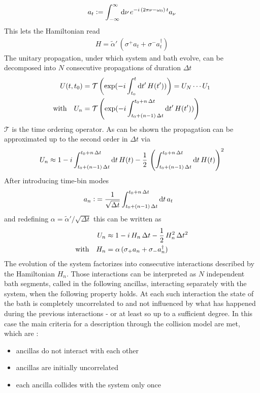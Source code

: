 \begin{align*}
    a_t\vcentcolon=\int_{-\infty}^{\infty}\text{d}\nu\,e^{-i\,(2\pi\nu-\omega_0)\, t}a_\nu
\end{align*}
This lets the Hamiltonian read
\begin{align*}
    H= \tilde{\alpha}'\,(\sigma^+a_t+\sigma^-a^\dagger_t)
\end{align*}
The unitary propagation, under which system and bath evolve, can be decomposed into $N$ consecutive propagations of duration $\Delta t$
\begin{align*}
    U(t,t_0)&=\mathcal{T}\left(  \exp(-i\int_{t_0}^t\text{d} t'\,H(t'))  \right)=U_{N}\cdots U_1\\
    \text{with}\quad U_n&=\mathcal{T}\left( \exp(-i\int_{t_0+(n-1)\,\Delta t}^{t_0+n\,\Delta t}\text{d} t'\,H(t'))  \right)
\end{align*}
$\mathcal{T}$ is the time ordering operator.
As can be shown \cite{ciccarello_quantum_2022} the propagation can be approximated up to the second order in $\Delta t$ via
\begin{align*}
    U_n \approx 1-i\int_{t_0+(n-1)\,\Delta t}^{t_0+n\,\Delta t}\text{d} t \,H(t) - \frac{1}{2}\,\left(\int_{t_0+(n-1)\,\Delta t}^{t_0+n\,\Delta t}\text{d} t \,H(t)\right)^2
\end{align*}
After introducing time-bin modes
\begin{align*}
    a_n\vcentcolon&=\frac{1}{\sqrt{\Delta t}}\int_{t_0+(n-1)\,\Delta t}^{t_0+n\,\Delta t}\text{d} t\,a_t
\end{align*}
and redefining $\alpha=\tilde{\alpha}'/\sqrt{\Delta t}$ this can be written as
\begin{align}\label{eq:approx_time_evolv}
    U_n &\approx 1-i\,H_n \,\Delta t-\frac{1}{2}\,H_n^2\,\Delta t^2\notag\\
    \text{with}\quad H_n&=\alpha\,(\sigma_+a_n+\sigma_-a^\dagger_n)
\end{align}
The evolution of the system factorizes into consecutive interactions described by the Hamiltonian $H_n$. Those interactions can be interpreted as $N$ independent bath segments, called in the following ancillas, interacting separately with the system, when the following property holds. At each such interaction the state of the bath is completely uncorrelated  to and not influenced by what has happened during the previous interactions - or at least so up to a sufficient degree. In this case the main criteria for a description through the collision model are met, which are \cite{ciccarello_quantum_2022}: 
\begin{itemize}
    \item ancillas do not interact with each other 
    \item ancillas are initially uncorrelated 
    \item each ancilla collides with the system only once 
\end{itemize}

